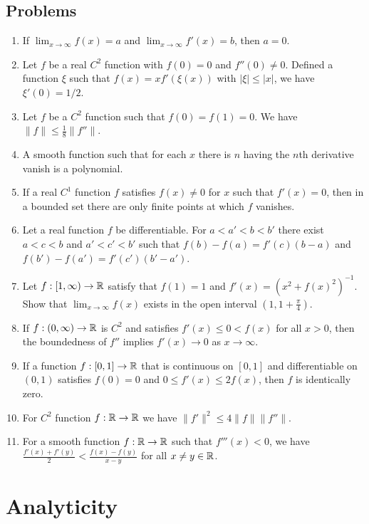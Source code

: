 \documentclass{../../large}
\begin{document}
\section*{Problems}
\begin{enumerate}
\item If $\lim_{x\to\infty}f(x)=a$ and $\lim_{x\to\infty}f'(x)=b$, then $a=0$.
\item Let $f$ be a real $C^2$ function with $f(0)=0$ and $f''(0)\ne0$.
Defined a function $\xi$ such that $f(x)=xf'(\xi(x))$ with $|\xi|\le|x|$, we have $\xi'(0)=1/2$.
\item Let $f$ be a $C^2$ function such that $f(0)=f(1)=0$.
We have $\|f\|\le\frac18\|f''\|$.
\item A smooth function such that for each $x$ there is $n$ having the $n$th derivative vanish is a polynomial.
\item If a real $C^1$ function $f$ satisfies $f(x)\ne0$ for $x$ such that $f'(x)=0$, then in a bounded set there are only finite points at which $f$ vanishes.
\item Let a real function $f$ be differentiable.
For $a<a'<b<b'$ there exist $a<c<b$ and $a'<c'<b'$ such that $f(b)-f(a)=f'(c)(b-a)$ and $f(b')-f(a')=f'(c')(b'-a')$.
\item Let $f:[1,\infty)\to\mathbb{R}$ satisfy that $f(1)=1$ and $f'(x)=(x^2+f(x)^2)^{-1}$. Show that $\lim_{x\to\infty}f(x)$ exists in the open interval $(1,1+\frac\pi4)$.
\item If $f:(0,\infty)\to\mathbb{R}$ is $C^2$ and satisfies $f'(x)\le0<f(x)$ for all $x>0$, then the boundedness of $f''$ implies $f'(x)\to0$ as $x\to\infty$.
\item If a function $f:[0,1]\to\mathbb{R}$ that is continuous on $[0,1]$ and differentiable on $(0,1)$ satisfies $f(0)=0$ and $0\le f'(x)\le2f(x)$, then $f$ is identically zero.
\item For $C^2$ function $f:\mathbb{R}\to\mathbb{R}$ we have $\|f'\|^2\le4\|f\|\|f''\|$.
\item For a smooth function $f:\mathbb{R}\to\mathbb{R}$ such that $f'''(x)<0$, we have $\frac{f'(x)+f'(y)}2<\frac{f(x)-f(y)}{x-y}$ for all $x\ne y\in\mathbb{R}$.
\end{enumerate}




\chapter{Analyticity}


\end{document}
